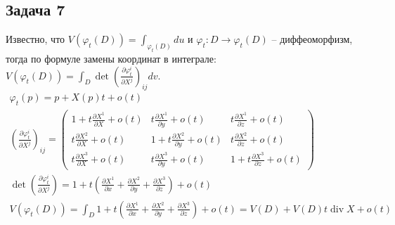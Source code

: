 \subsection*{Задача 7}
	Известно, что $V(\varphi_t(D)) = \int_{\varphi_t(D)} du$ и $\varphi_t: D \to \varphi_t(D)$ -- диффеоморфизм, тогда по формуле замены координат в интеграле: $V(\varphi_t(D)) = \int_D \det \left(\frac{\partial \varphi_t^{i}}{\partial X^{j}}\right)_{ij} dv$.
	\begin{gather*}
		\varphi_t(p) = p + X(p) t + o(t)\\
		\left(\frac{\partial \varphi_t^{i}}{\partial X^{j}}\right)_{ij} =
		\begin{pmatrix}
			1 + t\frac{\partial X^{1}}{\partial X} + o(t) & t\frac{\partial X^{1}}{\partial y} + o(t) & t\frac{\partial X^{1}}{\partial z} + o(t)\\
			t\frac{\partial X^{2}}{\partial X} + o(t) & 1 + t\frac{\partial X^{2}}{\partial y} + o(t) & t\frac{\partial X^{2}}{\partial z} + o(t)\\
			t\frac{\partial X^{3}}{\partial X} + o(t) & t\frac{\partial X^{3}}{\partial y} + o(t) & 1 + t\frac{\partial X^{3}}{\partial z} + o(t)
		\end{pmatrix}\\
		\det \left(\frac{\partial \varphi_t^{i}}{\partial X^{j}}\right) =
		1 + t \left(\frac{\partial X^{1}}{\partial x} + \frac{\partial X^{2}}{\partial y} + \frac{\partial X^{3}}{\partial z}\right) + o(t)\\
		V(\varphi_t(D)) = 
		\int_{D} 1 + t\left(\frac{\partial X^{1}}{\partial x} + \frac{\partial X^{2}}{\partial y} + \frac{\partial X^{3}}{\partial z}\right) + o(t) =
		V(D) + V(D)t \operatorname{div}X + o(t)
	\end{gather*}
\vskip0.5in


